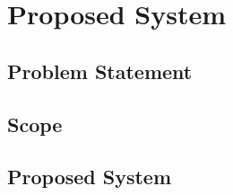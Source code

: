 
\chapter{Proposed System} \label{chap3}
\newpage

\section{Problem Statement}

\section{Scope}

\section{Proposed System}

